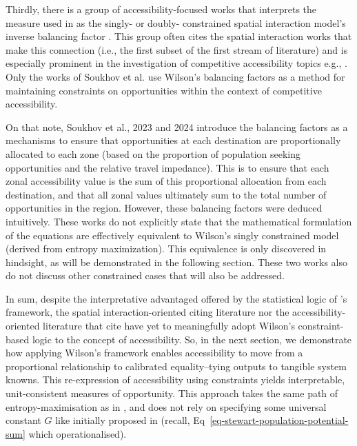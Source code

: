 \documentclass[
  10pt,
  letterpaper,
]{article}
\begin{document}
Thirdly, there is a group of accessibility-focused works that interprets
the measure used in \citet{hansen1959} as the singly- or doubly-
constrained spatial interaction model's inverse balancing factor
\citep[e.g.,][]{vickermanAccessibilityAttractionPotential1974}. This
group often cites the spatial interaction works that make this
connection (i.e., the first subset of the first stream of literature)
and is especially prominent in the investigation of competitive
accessibility topics e.g.,
\citep{karstEvaluationAccessibilityImpacts2003, geurs2006accessibility, willigers2007accessibility, el2011place, curtis2010planning, manaugh2012makes, chen2013regional, alonso2014labour, albacete2017measuring, sahebgharani2019computing, mayaud2019future, allenMeasureCompetitiveAccess2020, levinsonGeneralTheoryAccess2020, marwal2022literature, su2023untangling}.
Only the works of Soukhov et al.
\citep{soukhovIntroducingSpatialAvailability2023, soukhovMultimodalSpatialAvailability2024}
use Wilson's \citep{wilson1971} balancing factors as a method for
maintaining constraints on opportunities within the context of
competitive accessibility.

On that note, Soukhov et al., 2023 and 2024
\citep{soukhovIntroducingSpatialAvailability2023, soukhovMultimodalSpatialAvailability2024}
introduce the balancing factors as a mechanisms to ensure that
opportunities at each destination are proportionally allocated to each
zone (based on the proportion of population seeking opportunities and
the relative travel impedance). This is to ensure that each zonal
accessibility value is the sum of this proportional allocation from each
destination, and that all zonal values ultimately sum to the total
number of opportunities in the region. However, these balancing factors
were deduced intuitively. These works do not explicitly state that the
mathematical formulation of the equations are effectively equivalent to
Wilson's singly constrained model (derived from entropy maximization).
This equivalence is only discovered in hindsight, as will be
demonstrated in the following section. These two works also do not
discuss other constrained cases that will also be addressed.

In sum, despite the interpretative advantaged offered by the statistical
logic of \citet{wilson1971}'s framework, the spatial
interaction-oriented \citet{hansen1959} citing literature nor the
accessibility-oriented literature that cite \citet{wilson1971} have yet
to meaningfully adopt Wilson's constraint-based logic to the concept of
accessibility. So, in the next section, we demonstrate how applying
Wilson's framework enables accessibility to move from a proportional
relationship to calibrated equality--tying outputs to tangible system
knowns. This re-expression of accessibility using constraints yields
interpretable, unit-consistent measures of opportunity. This approach
takes the same path of entropy-maximisation as in \citet{wilson1971},
and does not rely on specifying some universal constant \(G\) like
initially proposed in \citet{stewartDemographicGravitationEvidence1948}
(recall, Eq~\ref{eq-stewart-population-potential-sum} which
\citet{hansen1959} operationalised).
\end{document}
